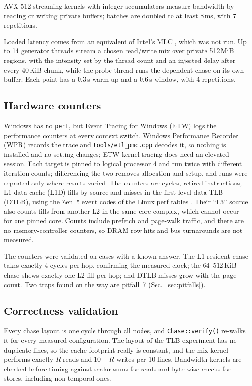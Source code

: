 \documentclass{article}
\begin{document}
AVX-512 streaming kernels with integer accumulators measure bandwidth by reading or writing private buffers; batches are doubled to at least 8\,ms, with 7 repetitions.

Loaded latency comes from an equivalent of Intel's MLC \cite{intelmlc}, which was not run. Up to 14 generator threads stream a chosen read/write mix over private 512\,MiB regions, with the intensity set by the thread count and an injected delay after every 40\,KiB chunk, while the probe thread runs the dependent chase on its own buffer. Each point has a 0.3\,s warm-up and a 0.6\,s window, with 4 repetitions.

\subsection{Hardware counters}\label{sec:countermethod}
Windows has no \texttt{perf}, but Event Tracing for Windows (ETW) logs the performance counters at every context switch. Windows Performance Recorder (WPR) records the trace and \texttt{tools/etl\_pmc.cpp} decodes it, so nothing is installed and no setting changes; ETW kernel tracing does need an elevated session. Each target is pinned to logical processor 4 and run twice with different iteration counts; differencing the two removes allocation and setup, and runs were repeated only where results varied. The counters are cycles, retired instructions, L1 data cache (L1D) fills by source and misses in the first-level data TLB (DTLB), using the Zen~5 event codes of the Linux perf tables \cite{perfzen5}. Their ``L3'' source also counts fills from another L2 in the same core complex, which cannot occur for one pinned core. Counts include prefetch and page-walk traffic, and there are no memory-controller counters, so DRAM row hits and bus turnarounds are not measured.

The counters were validated on cases with a known answer. The L1-resident chase takes exactly 4 cycles per hop, confirming the measured clock; the 64--512\,KiB chase shows exactly one L2 fill per hop; and DTLB misses grow with the page count. Two traps found on the way are pitfall~7 (Sec.~\ref{sec:pitfalls}).

\subsection{Correctness validation}\label{sec:valid}
Every chase layout is one cycle through all nodes, and \texttt{Chase::verify()} re-walks it for every measured configuration. The layout of the TLB experiment has no duplicate lines, so the cache footprint really is constant, and the mix kernel performs exactly $R$ reads and $10-R$ writes per 10 lines. Bandwidth kernels are checked before timing against scalar sums for reads and byte-wise checks for stores, including non-temporal ones.
\end{document}
